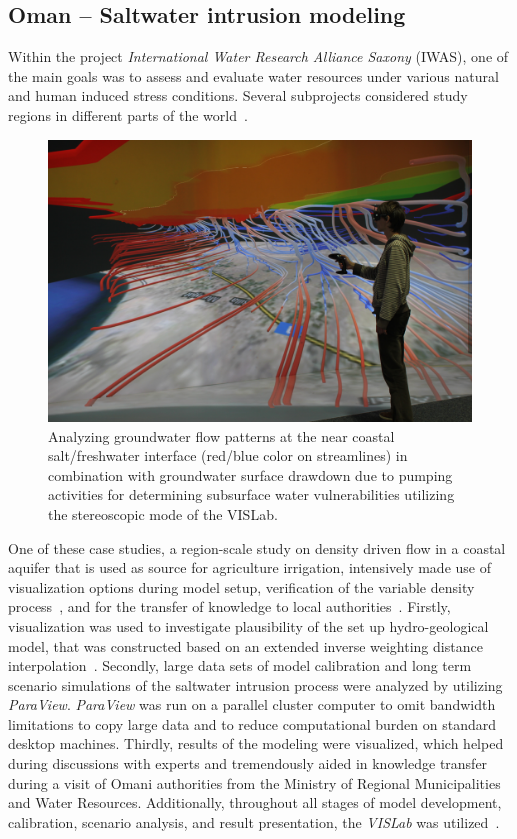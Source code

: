 \documentclass[twocolumn]{svjour3}          %
\begin{document}
\subsection{Oman -- Saltwater intrusion modeling}
\label{oman---saltwater-intrusion}

Within the project \emph{International Water Research Alliance Saxony} (IWAS), one of the main goals was to assess and evaluate water resources under various natural and human induced stress conditions. Several subprojects considered study regions in different parts of the world~\cite{kalbus:ees}.

\begin{figure}[htb]
  \includegraphics[width=\linewidth]{images/oman.jpg}
\caption{Analyzing groundwater flow patterns at the near coastal salt/freshwater interface (red/blue color on streamlines) in combination with groundwater surface drawdown due to pumping activities for determining subsurface water vulnerabilities utilizing the stereoscopic mode of the VISLab.}
\label{fig:oman}
\end{figure}

One of these case studies, a region-scale study on density driven flow in a coastal aquifer that is used as source for agriculture irrigation, intensively made use of visualization options during model setup, verification of the variable density process~\cite{Beinhorn200589}, and for the transfer of knowledge to local authorities~\cite{walther:cam, walther:eesenvirvis}. Firstly, visualization was used to investigate plausibility of the set up hydro-geological model, that was constructed based on an extended inverse weighting distance interpolation~\cite{walther:modelcare}. Secondly, large data sets of model calibration and long term scenario simulations of the saltwater intrusion process were analyzed by utilizing \emph{ParaView}. \emph{ParaView} was run on a parallel cluster computer to omit bandwidth limitations to copy large data and to reduce computational burden on standard desktop machines. Thirdly, results of the modeling were visualized, which helped during discussions with experts and tremendously aided in knowledge transfer during a visit of Omani authorities from the Ministry of Regional Municipalities and Water Resources. Additionally, throughout all stages of model development, calibration, scenario analysis, and result presentation, the \emph{VISLab} was utilized~\cite{walther:eesenvirvis}.
\end{document}
